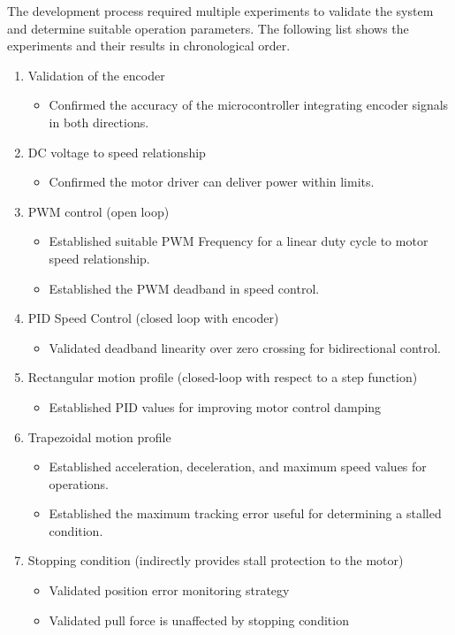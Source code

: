 The development process required multiple experiments to validate the system and determine suitable operation parameters. The following list shows the experiments and their results in chronological order.
\begin{enumerate}
\item Validation of the encoder
    \begin{itemize}
        \item Confirmed the accuracy of the microcontroller integrating encoder signals in both directions.
    \end{itemize}
    \item DC voltage to speed relationship
    \begin{itemize}
        \item Confirmed the motor driver can deliver power within limits.
    \end{itemize}
    \item PWM control (open loop)
    \begin{itemize}
        \item Established suitable PWM Frequency for a linear duty cycle to motor speed relationship.
        \item Established the PWM deadband in speed control.
    \end{itemize}
    \item PID Speed Control (closed loop with encoder)
    \begin{itemize}
        \item Validated deadband linearity over zero crossing for bidirectional control.
    \end{itemize}
    \item Rectangular motion profile (closed-loop with respect to a step function)
    \begin{itemize}
        \item Established PID values for improving motor control damping
    \end{itemize}
    \item Trapezoidal motion profile
    \begin{itemize}
        \item Established acceleration, deceleration, and maximum speed values for operations.
        \item Established the maximum tracking error useful for determining a stalled condition.
    \end{itemize}
    \item Stopping condition (indirectly provides stall protection to the motor)
    \begin{itemize}
        \item Validated position error monitoring strategy
        \item Validated pull force is unaffected by stopping condition
    \end{itemize}
\end{enumerate}

